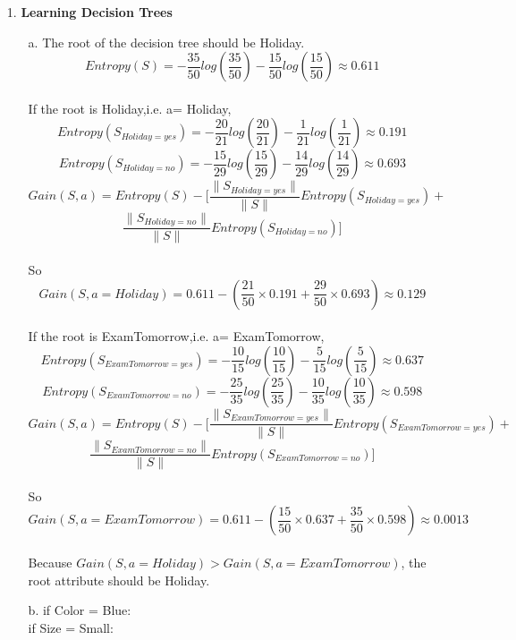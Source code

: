 

\oddsidemargin 0in
\evensidemargin 0in
\textwidth 6.5in
\topmargin -0.5in
\textheight 9.0in




\pagestyle{myheadings}  %

\begin{enumerate}
\item[1.]\textbf{Learning Decision Trees}
	\begin{enumerate}
		\item[a.]The root of the decision tree should be Holiday.\\
				 \[Entropy(S)=-\frac{35}{50}log(\frac{35}{50})-\frac{15}{50}log(\frac{15}{50})\approx0.611\]\\
				 If the root is Holiday,i.e. a= Holiday,
				 \[Entropy(S_{Holiday=yes})=-\frac{20}{21}log(\frac{20}{21})-\frac{1}{21}log(\frac{1}{21})\approx0.191\]
				 \[Entropy(S_{Holiday=no})=-\frac{15}{29}log(\frac{15}{29})-\frac{14}{29}log(\frac{14}{29})\approx0.693\]
				 \[Gain(S,a)=Entropy(S)-[\frac{\|S_{Holiday=yes}\|}{\|S\|}Entropy(S_{Holiday=yes})+\]\[\frac{\|S_{Holiday=no}\|}{\|S\|}Entropy(S_{Holiday=no})]\]\\
				 So
				 \[Gain(S,a=Holiday)=0.611-(\frac{21}{50}\times0.191+\frac{29}{50}\times0.693)\approx0.129\]\\
				 If the root is ExamTomorrow,i.e. a= ExamTomorrow,
				 \[Entropy(S_{ExamTomorrow=yes})=-\frac{10}{15}log(\frac{10}{15})-\frac{5}{15}log(\frac{5}{15})\approx0.637\]
				 \[Entropy(S_{ExamTomorrow=no})=-\frac{25}{35}log(\frac{25}{35})-\frac{10}{35}log(\frac{10}{35})\approx0.598\]
				 \[Gain(S,a)=Entropy(S)-[\frac{\|S_{ExamTomorrow=yes}\|}{\|S\|}Entropy(S_{ExamTomorrow=yes})+\]\[\frac{\|S_{ExamTomorrow=no}\|}{\|S\|}Entropy(S_{ExamTomorrow=no})]\]\\
				 So
				 \[Gain(S,a=ExamTomorrow)=0.611-(\frac{15}{50}\times0.637+\frac{35}{50}\times0.598)\approx0.0013\]\\
				 Because \(Gain(S,a=Holiday)>Gain(S,a=ExamTomorrow)\), the root attribute should be Holiday.\\
		\item[b.]if Color = Blue:\\
				 \hspace*{5 mm}if Size = Small:\\

\end{enumerate}
\end{enumerate}
